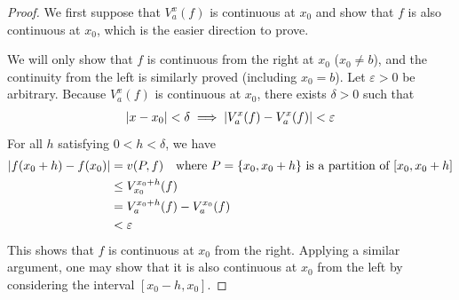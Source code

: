 \documentclass[thmcnt=section, color=blue, 12pt]{my-elegantbook}
\begin{document}
\begin{proof}
	We first suppose that $V_a^x(f)$ is continuous at $x_0$
	and show that $f$ is also continuous at $x_0$,
	which is the easier direction to prove.

	We will only show that $f$ is continuous from the right at $x_0$ ($x_0 \neq b$),
	and the continuity from the left is similarly proved (including $x_0 = b$).
	Let $\varepsilon > 0$ be arbitrary.
	Because $V_a^x(f)$ is continuous at $x_0$,
	there exists $\delta  > 0$ such that
	\begin{align*}
		\left\lvert x - x_0 \right\rvert < \delta \implies \left\lvert V_a^x(f) - V_a^x(f) \right\rvert < \varepsilon
	\end{align*}
	For all $h$ satisfying $0 < h < \delta$, we have
	\begin{align*}
		\left\lvert f(x_0 + h) - f(x_0) \right\rvert
		 & = v(P, f) \quad \text{where $P = \{x_0, x_0+h\}$ is a partition of $[x_0, x_0+h]$} \\
		 & \leq V_{x_0}^{x_0+h}(f)                                                            \\
		 & = V_a^{x_0+h}(f) - V_a^{x_0}(f)                                                    \\
		 & < \varepsilon
	\end{align*}
	This shows that $f$ is continuous at $x_0$ from the right.
	Applying a similar argument,
	one may show that it is also continuous at $x_0$ from the left
	by considering the interval $[x_0-h, x_0]$.


\end{proof}
\end{document}
